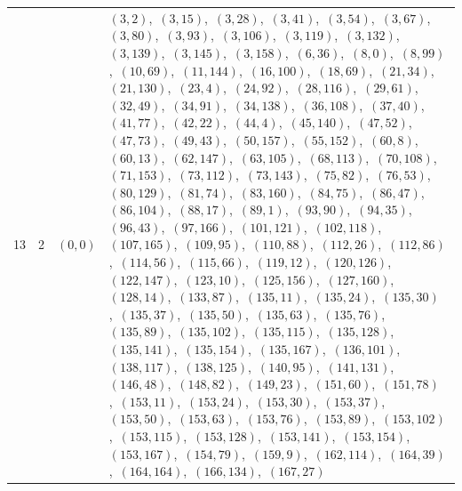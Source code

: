 \documentclass[11pt]{article}
\begin{document}
\begin{longtable}{@{}rrl>{\raggedright\arraybackslash}p{}@{}}
13 & 2 & $(0,0)$ & $(3,2)$,\allowbreak\ $(3,15)$,\allowbreak\ $(3,28)$,\allowbreak\ $(3,41)$,\allowbreak\ $(3,54)$,\allowbreak\ $(3,67)$,\allowbreak\ $(3,80)$,\allowbreak\ $(3,93)$,\allowbreak\ $(3,106)$,\allowbreak\ $(3,119)$,\allowbreak\ $(3,132)$,\allowbreak\ $(3,139)$,\allowbreak\ $(3,145)$,\allowbreak\ $(3,158)$,\allowbreak\ $(6,36)$,\allowbreak\ $(8,0)$,\allowbreak\ $(8,99)$,\allowbreak\ $(10,69)$,\allowbreak\ $(11,144)$,\allowbreak\ $(16,100)$,\allowbreak\ $(18,69)$,\allowbreak\ $(21,34)$,\allowbreak\ $(21,130)$,\allowbreak\ $(23,4)$,\allowbreak\ $(24,92)$,\allowbreak\ $(28,116)$,\allowbreak\ $(29,61)$,\allowbreak\ $(32,49)$,\allowbreak\ $(34,91)$,\allowbreak\ $(34,138)$,\allowbreak\ $(36,108)$,\allowbreak\ $(37,40)$,\allowbreak\ $(41,77)$,\allowbreak\ $(42,22)$,\allowbreak\ $(44,4)$,\allowbreak\ $(45,140)$,\allowbreak\ $(47,52)$,\allowbreak\ $(47,73)$,\allowbreak\ $(49,43)$,\allowbreak\ $(50,157)$,\allowbreak\ $(55,152)$,\allowbreak\ $(60,8)$,\allowbreak\ $(60,13)$,\allowbreak\ $(62,147)$,\allowbreak\ $(63,105)$,\allowbreak\ $(68,113)$,\allowbreak\ $(70,108)$,\allowbreak\ $(71,153)$,\allowbreak\ $(73,112)$,\allowbreak\ $(73,143)$,\allowbreak\ $(75,82)$,\allowbreak\ $(76,53)$,\allowbreak\ $(80,129)$,\allowbreak\ $(81,74)$,\allowbreak\ $(83,160)$,\allowbreak\ $(84,75)$,\allowbreak\ $(86,47)$,\allowbreak\ $(86,104)$,\allowbreak\ $(88,17)$,\allowbreak\ $(89,1)$,\allowbreak\ $(93,90)$,\allowbreak\ $(94,35)$,\allowbreak\ $(96,43)$,\allowbreak\ $(97,166)$,\allowbreak\ $(101,121)$,\allowbreak\ $(102,118)$,\allowbreak\ $(107,165)$,\allowbreak\ $(109,95)$,\allowbreak\ $(110,88)$,\allowbreak\ $(112,26)$,\allowbreak\ $(112,86)$,\allowbreak\ $(114,56)$,\allowbreak\ $(115,66)$,\allowbreak\ $(119,12)$,\allowbreak\ $(120,126)$,\allowbreak\ $(122,147)$,\allowbreak\ $(123,10)$,\allowbreak\ $(125,156)$,\allowbreak\ $(127,160)$,\allowbreak\ $(128,14)$,\allowbreak\ $(133,87)$,\allowbreak\ $(135,11)$,\allowbreak\ $(135,24)$,\allowbreak\ $(135,30)$,\allowbreak\ $(135,37)$,\allowbreak\ $(135,50)$,\allowbreak\ $(135,63)$,\allowbreak\ $(135,76)$,\allowbreak\ $(135,89)$,\allowbreak\ $(135,102)$,\allowbreak\ $(135,115)$,\allowbreak\ $(135,128)$,\allowbreak\ $(135,141)$,\allowbreak\ $(135,154)$,\allowbreak\ $(135,167)$,\allowbreak\ $(136,101)$,\allowbreak\ $(138,117)$,\allowbreak\ $(138,125)$,\allowbreak\ $(140,95)$,\allowbreak\ $(141,131)$,\allowbreak\ $(146,48)$,\allowbreak\ $(148,82)$,\allowbreak\ $(149,23)$,\allowbreak\ $(151,60)$,\allowbreak\ $(151,78)$,\allowbreak\ $(153,11)$,\allowbreak\ $(153,24)$,\allowbreak\ $(153,30)$,\allowbreak\ $(153,37)$,\allowbreak\ $(153,50)$,\allowbreak\ $(153,63)$,\allowbreak\ $(153,76)$,\allowbreak\ $(153,89)$,\allowbreak\ $(153,102)$,\allowbreak\ $(153,115)$,\allowbreak\ $(153,128)$,\allowbreak\ $(153,141)$,\allowbreak\ $(153,154)$,\allowbreak\ $(153,167)$,\allowbreak\ $(154,79)$,\allowbreak\ $(159,9)$,\allowbreak\ $(162,114)$,\allowbreak\ $(164,39)$,\allowbreak\ $(164,164)$,\allowbreak\ $(166,134)$,\allowbreak\ $(167,27)$\\

\end{longtable}
\end{document}
